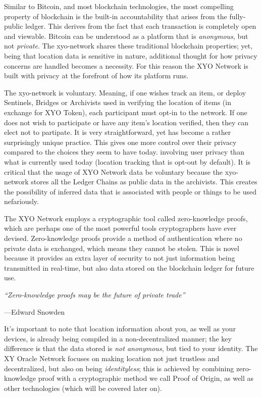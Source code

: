 \documentclass{article}
\begin{document}
Similar to Bitcoin, and most blockchain technologies, the most compelling property of blockchain is the built-in accountability that arises from the fully-public ledger. This derives from the fact that each transaction is completely open and viewable. Bitcoin can be understood as a platform that is \textit{anonymous}, but not \textit{private}. The \Gls{xyo-network} shares these traditional blockchain properties; yet, being that location data is sensitive in nature, additional thought for how privacy concerns are handled becomes a necessity. For this reason the XYO Network is built with privacy at the forefront of how its platform runs. 

The \Gls{xyo-network} is voluntary. Meaning, if one wishes track an item, or deploy Sentinels, Bridges or Archivists used in verifying the location of items (in exchange for XYO Token), each participant must opt-in to the network. If one does not wish to participate or have any item's location verified, then they can elect not to partipate. It is very straightforward, yet has become a rather surprisingly unique practice.  This gives one more control over their privacy compared to the choices they seem to have today. involving user privacy than what is currently used today (location tracking that is opt-out by default). It is critical that the usage of XYO Network data be voluntary because the \Gls{xyo-network} stores all the Ledger Chains as public data in the \Glspl{archivist}. This creates the possibility of inferred data that is associated with people or things to be used nefariously.

The XYO Network employs a cryptographic tool called zero-knowledge proofs, which are perhaps one of the most powerful tools cryptographers have ever devised. Zero-knowledge proofs provide a method of authentication where no private data is exchanged, which means they cannot be stolen. This is novel because it provides an extra layer of security to not just information being transmitted in real-time, but also data stored on the blockchain ledger for future use.

\begin{displayquote}\textit{``Zero-knowledge proofs may be the future of private trade''}

\vspace{2mm}
---Edward Snowden
\end{displayquote}

It's important to note that location information about you, as well as your devices, is already being compiled in a non-decentralized manner; the key difference is that the data stored is \textit{not anonymous}, but tied to your identity. The XY Oracle Network focuses on making location not just trustless and decentralized, but also on being \textit{identityless}; this is achieved by combining zero-knowledge proof with a cryptographic method we call Proof of Origin, as well as other technologies (which will be covered later on).
\end{document}

